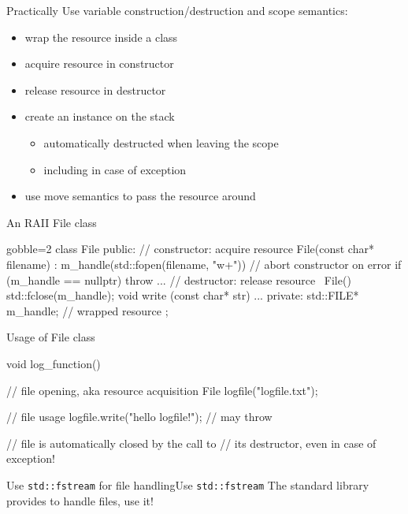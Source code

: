 \begin{frame}
  \begin{block}{Practically}
    Use variable construction/destruction and scope semantics:
    \begin{itemize}
    \item wrap the resource inside a class
    \item acquire resource in constructor
    \item release resource in destructor
    \item create an instance on the stack
    \begin{itemize}
      \item automatically destructed when leaving the scope
      \item including in case of exception
    \end{itemize}
    \item use move semantics to pass the resource around
    \end{itemize}
  \end{block}
\end{frame}

\begin{frame}[fragile]
  \begin{exampleblock}{An RAII File class}
    \small
    \begin{cppcode*}{gobble=2}
      class File {
      public:
        // constructor: acquire resource
        File(const char* filename)
          : m_handle(std::fopen(filename, "w+")) {
          // abort constructor on error
          if (m_handle == nullptr) { throw ... }
        }
        // destructor: release resource
        ~File() { std::fclose(m_handle); }
        void write (const char* str) {
          ...
        }
      private:
        std::FILE* m_handle; // wrapped resource
      };
    \end{cppcode*}
  \end{exampleblock}
\end{frame}

\begin{frame}[fragile]
  \begin{exampleblock}{Usage of File class}
    \begin{cppcode*}{}
      void log_function() {
        // file opening, aka resource acquisition
        File logfile("logfile.txt");

        // file usage
        logfile.write("hello logfile!"); // may throw

        // file is automatically closed by the call to
        // its destructor, even in case of exception!
      }
    \end{cppcode*}
  \end{exampleblock}
  \begin{goodpracticeWithShortcut}{Use \texttt{std::fstream} for file handling}{Use \texttt{std::fstream}}
     The standard library provides  to handle files, use it!
  \end{goodpracticeWithShortcut}
\end{frame}

